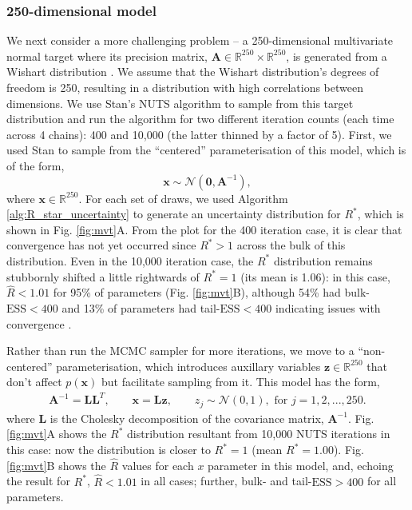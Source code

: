 \documentclass{article}
\begin{document}
\subsubsection{250-dimensional model}\label{sec:multivariate_normal_250}
We next consider a more challenging problem -- a 250-dimensional multivariate normal target where its precision matrix, $\boldsymbol{A}\in\mathbb{R}^{250}\times\mathbb{R}^{250}$, is generated from a Wishart distribution \citep{hoffman2014no}. We assume that the Wishart distribution's degrees of freedom is 250, resulting in a distribution with high correlations between dimensions. We use Stan's NUTS algorithm to sample from this target distribution and run the algorithm for two different iteration counts (each time across 4 chains): 400 and 10,000 (the latter thinned by a factor of 5). First, we used Stan to sample from the ``centered'' parameterisation of this model, which is of the form,
%
\begin{equation}\label{eq:mvt_normal_250}
\boldsymbol{x}\sim \mathcal{N}(\boldsymbol{0},\boldsymbol{A}^{-1}),
\end{equation}
%
where $\boldsymbol{x}\in\mathbb{R}^{250}$. For each set of draws, we used Algorithm \ref{alg:R_star_uncertainty} to generate an uncertainty distribution for $R^*$, which is shown in Fig. \ref{fig:mvt}A. From the plot for the 400 iteration case, it is clear that convergence has not yet occurred since $R^*>1$ across the bulk of this distribution. Even in the 10,000 iteration case, the $R^*$ distribution remains stubbornly shifted a little rightwards of $R^*=1$ (its mean is 1.06): in this case, $\widehat{R}<1.01$ for 95\% of parameters (Fig. \ref{fig:mvt}B), although 54\% had bulk-$\text{ESS}<400$ and 13\% of parameters had tail-$\text{ESS}<400$ indicating issues with convergence \citep{vehtari2019rank}.

Rather than run the MCMC sampler for more iterations, we move to a ``non-centered'' parameterisation, which introduces auxillary variables $\boldsymbol{z}\in\mathbb{R}^{250}$ that don't affect $p(\boldsymbol{x})$ but facilitate sampling from it. This model has the form,
%
\begin{align}
\boldsymbol{A}^{-1} = \boldsymbol{L}\boldsymbol{L}^T,\qquad
\boldsymbol{x} = \boldsymbol{L} \boldsymbol{z},\qquad
z_j\sim \mathcal{N}(0, 1), \text{ for } j = 1,2,...,250.
\end{align}
%
where $\boldsymbol{L}$ is the Cholesky decomposition of the covariance matrix, $\boldsymbol{A}^{-1}$. Fig. \ref{fig:mvt}A shows the $R^*$ distribution resultant from 10,000 NUTS iterations in this case: now the distribution is closer to $R^*=1$ (mean $R^*=1.00$). Fig. \ref{fig:mvt}B shows the $\widehat{R}$ values for each $x$ parameter in this model, and, echoing the result for $R^*$, $\widehat{R}<1.01$ in all cases; further, bulk- and tail-$\text{ESS}>400$ for all parameters.
\end{document}
